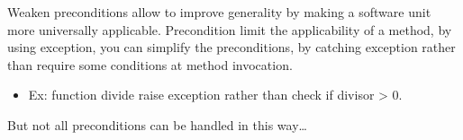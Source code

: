 Weaken preconditions allow to improve generality by making a software
unit more universally applicable. Precondition limit the applicability
of a method, by using exception, you can simplify the preconditions, by
catching exception rather than require some conditions at method
invocation. 

\begin{itemize}
\item Ex: function divide raise exception rather than check if divisor > 0.
    \end{itemize}

But not all preconditions can be handled in this way\ldots
